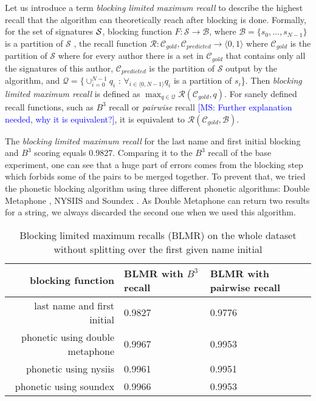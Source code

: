 \documentclass{article}
\newcommand{\msnote}[1]{\textcolor{blue}{[MS: #1]}}
\begin{document}
Let us introduce a term \textit{blocking limited maximum recall} to describe the highest
recall that the algorithm can theoretically reach after blocking is done.
Formally, for the set of signatures ${\cal S}$, blocking function $F: \mathcal{S}
\rightarrow \mathcal{B}$, where $ \mathcal{B} = \{s_{0}, \ldots{} , s_{N-1}\}$ is a
partition of $\mathcal{S} $ , the recall function $\mathcal{R}: \mathcal{C}_{gold},
\mathcal{C}_{predicted} \rightarrow \langle0,1\rangle$ where $\mathcal{C}_{gold}$ is the
partition of $\mathcal{S}$ where for every author there is a set in $\mathcal{C}_{gold}$
that contains only all the signatures of this author, $\mathcal{C}_{predicted}$ is the
partition of $\mathcal{S}$ output by the algorithm, and $\mathcal{Q} = \{\cup_{i=0}^{N-1}
q_i $ : $\forall_{i \in \langle0,N-1\rangle} q_i$ is a partition of $s_i$\}. Then
\textit{blocking limited maximum recall} is defined as $\max_{q \in \mathcal{Q}}
\mathcal{R}(\mathcal{C}_{gold}, q)$. For sanely defined recall functions, such as $B^{3}$
recall or \textit{pairwise} recall \msnote{Further explanation needed, why it is
equivalent?}, it is equivalent to $\mathcal{R}(\mathcal{C}_{gold}, \mathcal{B})$.

The \textit{blocking limited maximum recall} for the last name and first initial blocking
and $B^3$ scoring equals 0.9827. Comparing it to the $B^3$ recall of the base experiment,
one can see that a huge part of errors comes from the blocking step which forbids some of
the pairs to be merged together. To prevent that, we tried the phonetic blocking algorithm
using three different phonetic algorithms: Double Metaphone \citep{doublemetaphone}, NYSIIS
\citep{nysiis} and Soundex \citep{Soundex}. As Double Metaphone can return two results for a
string, we always discarded the second one when we used this algorithm.

\begin{table}[H]
\caption{Blocking limited maximum recalls (BLMR) on the whole dataset without splitting over
the first given name initial}
\centering
\begin{tabular}{|r|l|l|}
  \hline
  blocking function & BLMR with $B^{3}$ recall & BLMR with pairwise recall \\
  \hline
  last name and first initial & 0.9827 & 0.9776 \\
  \hline
  phonetic using double metaphone & 0.9967 & 0.9953 \\
  \hline
  phonetic using nysiis & 0.9961 & 0.9951 \\
  \hline
  phonetic using soundex & 0.9966 & 0.9953 \\
  \hline
\end{tabular}
\end{table}
\end{document}
